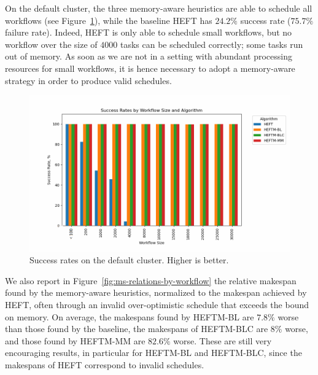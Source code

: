 \documentclass[conference]{IEEEtran}
\newcommand{\algo}[1]{\textsc{#1}}
\newcommand{\heft}{\algo{HEFT}\xspace}
\newcommand{\heftmm}{\algo{HEFTM-MM}\xspace}
\newcommand{\heftbl}{\algo{HEFTM-BL}\xspace}
\newcommand{\heftblc}{\algo{HEFTM-BLC}\xspace}
\begin{document}

    On the default cluster,  the three memory-aware heuristics are able to schedule all workflows
    (see Figure~\ref{fig:success-rates-large}), while
    the baseline \heft has $24.2\%$ success rate ($75.7\%$ failure rate).
    Indeed, \heft is only able to schedule small workflows, but no workflow over the size of $4000$ tasks
    can be scheduled correctly; some tasks run out of memory. As soon as we are not in a setting
    with abundant processing resources for small workflows, it is hence necessary to adopt
    a memory-aware strategy in order to produce valid schedules.

    \begin{figure}[tb]
        \centering
        \includegraphics[width=0.99\columnwidth] {images/success-rates-large}
        \caption{Success rates on the default cluster. Higher is better.}
        \label{fig:success-rates-large}
        \vspace{-0.3cm}
    \end{figure}

   We also report in  Figure~\ref{fig:ms-relations-by-workflow}  the relative makespan found
   by the memory-aware heuristics, normalized to the
   makespan achieved by \heft, often through an invalid over-optimistic schedule that exceeds
   the bound on memory.
    On average, the makespans found by \heftbl are $7.8\%$ worse than those found by the baseline,
    the makespans of \heftblc are $8\%$
    worse, and those found by \heftmm are $82.6\%$ worse. These are still very encouraging results,
    in particular for \heftbl and \heftblc, since the makespans of \heft correspond to invalid schedules.
\end{document}
